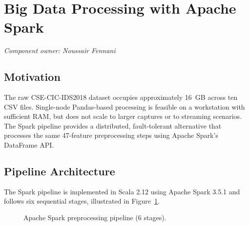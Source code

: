 \documentclass[12pt]{article}
\theoremstyle{plain}
\begin{document}
\newpage
\section{Big Data Processing with Apache Spark}
\label{sec:bigdata}
\textit{Component owner: Noussair Fennani}

\subsection{Motivation}

The raw CSE-CIC-IDS2018 dataset occupies approximately 16~GB across ten CSV files. Single-node Pandas-based processing is feasible on a workstation with sufficient RAM, but does not scale to larger captures or to streaming scenarios. The Spark pipeline provides a distributed, fault-tolerant alternative that processes the same 47-feature preprocessing steps using Apache Spark's DataFrame API.

\subsection{Pipeline Architecture}

The Spark pipeline is implemented in Scala 2.12 using Apache Spark 3.5.1 and follows six sequential stages, illustrated in Figure~\ref{fig:spark_pipeline}.

\begin{figure}[H]
\centering
{}
\caption{Apache Spark preprocessing pipeline (6 stages).}
\label{fig:spark_pipeline}
\end{figure}
\end{document}
